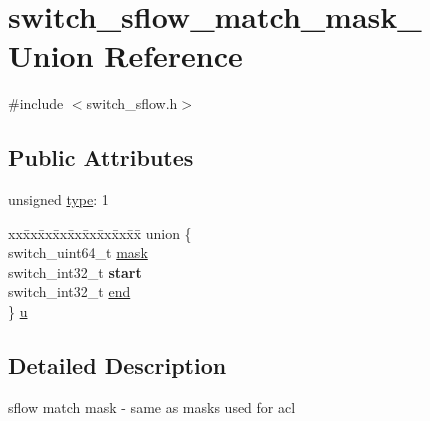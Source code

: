 \hypertarget{unionswitch__sflow__match__mask__}{\section{switch\+\_\+sflow\+\_\+match\+\_\+mask\+\_\+ Union Reference}
\label{unionswitch__sflow__match__mask__}
}


{\ttfamily \#include $<$switch\+\_\+sflow.\+h$>$}

\subsection*{Public Attributes}
\begin{DoxyCompactItemize}
\item 
unsigned \hyperlink{unionswitch__sflow__match__mask___ad9f364296d71b6888b190d247ae9abb3}{type}\+: 1
\item 
\begin{tabbing}
xx\=xx\=xx\=xx\=xx\=xx\=xx\=xx\=xx\=\kill
union \{\\
\>switch\_uint64\_t \hyperlink{unionswitch__sflow__match__mask___acd49bba7f7f1189ec4613a6f487186a7}{mask}\\
\>switch\_int32\_t {\bfseries start}\\
\>switch\_int32\_t \hyperlink{unionswitch__sflow__match__mask___ac8e69eb65bc6c38e4ffe165f36098054}{end}\\
\} \hyperlink{unionswitch__sflow__match__mask___ab67bedea67389b5c16d654992af27b94}{u}\\

\end{tabbing}\end{DoxyCompactItemize}


\subsection{Detailed Description}
sflow match mask -\/ same as masks used for acl 

